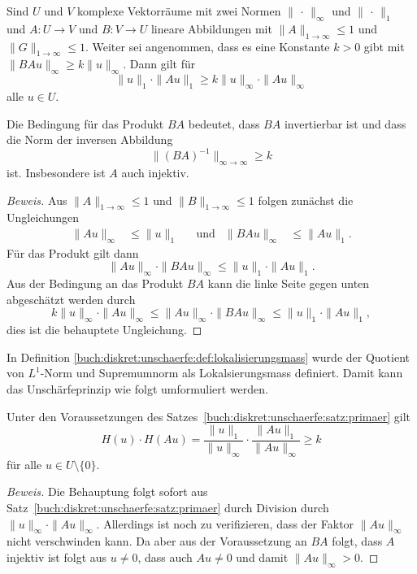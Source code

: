 \begin{satz}
\label{buch:diskret:unschaerfe:satz:primaer}
Sind $U$ und $V$ komplexe Vektorräume mit zwei Normen $\|\,\cdot\,\|_\infty$
und $\|\,\cdot\,\|_1$ und $A\colon U\to V$ und $B\colon V\to U$ lineare
Abbildungen mit $\|A\|_{1\to\infty}\le 1$ und $\|G\|_{1\to\infty}\le 1$.
Weiter sei angenommen, dass es eine Konstante $k>0$ gibt mit
$\|BAu\|_\infty \ge k\|u\|_\infty$.
Dann gilt für
\[
\|u\|_1\cdot \|Au\|_1 \ge k\|u\|_\infty\cdot \|Au\|_\infty
\]
alle $u\in U$.
\end{satz}

Die Bedingung für das Produkt $BA$ bedeutet, dass $BA$ invertierbar ist
und dass die Norm der inversen Abbildung
\[
\|(BA)^{-1}\|_{\infty\to\infty}
\ge k
\]
ist.
Insbesondere ist $A$ auch injektiv.

\begin{proof}[Beweis]
Aus $\|A\|_{1\to\infty}\le 1$ und $\|B\|_{1\to\infty}\le 1$ folgen
zunächst die Ungleichungen
\begin{align*}
\|Au\|_\infty &\le \|u\|_1
&&\text{und}&
\|BAu\|_\infty &\le \|Au\|_1.
\end{align*}
Für das Produkt gilt dann
\[
\|Au\|_\infty
\cdot
\|BAu\|_\infty
\le
\|u\|_1
\cdot
\|Au\|_1.
\]
Aus der Bedingung an das Produkt $BA$ kann die linke Seite gegen unten
abgeschätzt werden durch
\[
k\|u\|_\infty
\cdot
\|Au\|_\infty
\le
\|Au\|_\infty
\cdot
\|BAu\|_\infty
\le
\|u\|_1
\cdot
\|Au\|_1,
\]
dies ist die behauptete Ungleichung.
\end{proof}

In Definition \ref{buch:diskret:unschaerfe:def:lokalisierungsmass}
wurde der Quotient von $L^1$-Norm und Supremumnorm als
Lokalsierungsmass definiert.
Damit kann das Unschärfeprinzip wie folgt umformuliert werden.

\begin{satz}
Unter den Voraussetzungen des
Satzes~\ref{buch:diskret:unschaerfe:satz:primaer}
gilt
\[
H(u)\cdot H(Au)
=
\frac{\|u\|_1}{\|u\|_\infty}
\cdot
\frac{\|Au\|_1}{\|Au\|_\infty}
\ge k
\]
für alle $u\in U\setminus\{0\}$.
\end{satz}

\begin{proof}[Beweis]
Die Behauptung folgt sofort aus Satz~\ref{buch:diskret:unschaerfe:satz:primaer}
durch Division durch $\|u\|_\infty\cdot \|Au\|_\infty$.
Allerdings ist noch zu verifizieren, dass der Faktor $\|Au\|_\infty$
nicht verschwinden kann.
Da aber aus der Voraussetzung an $BA$ folgt, dass $A$ injektiv ist
folgt aus $u\ne 0$, dass auch $Au\ne 0$ und damit $\|Au\|_\infty> 0$.
\end{proof}

